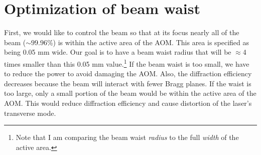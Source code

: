 \section{Optimization of beam waist}\label{optimbeamWaist}
First, we would like to control the beam so that at its focus nearly all of the beam ($\sim99.96$\%) is within the active area of the AOM.
This area is specified as being 0.05 mm wide. Our goal is to have a beam waist radius that will be $\approx$4 times smaller than this 0.05 mm value.\footnote{Note that I am comparing the beam waist \emph{radius} to the full \emph{width} of the active area.} %
If the beam waist is too small, we have to reduce the power to avoid damaging the AOM. Also, the diffraction efficiency decreases because the beam will interact with fewer Bragg planes. If the waist is too large, only a small portion of the beam would be within the active area of the AOM. This would reduce diffraction efficiency and cause distortion of the laser's transverse mode.

